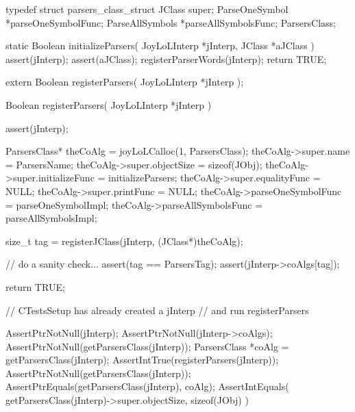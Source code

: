 \startTestSuite[registerParsers]

\startCHeader
typedef struct parsers_class_struct {
  JClass       super;
  ParseOneSymbol  *parseOneSymbolFunc;
  ParseAllSymbols *parseAllSymbolsFunc;
} ParsersClass;
\stopCHeader

\startCCode
static Boolean initializeParsers(
  JoyLoLInterp *jInterp,
  JClass   *aJClass
) {
  assert(jInterp);
  assert(aJClass);
  registerParserWords(jInterp);
  return TRUE;
}
\stopCCode

\startCHeader
extern Boolean registerParsers(
  JoyLoLInterp *jInterp
);
\stopCHeader
{}

\startCCode
Boolean registerParsers(
  JoyLoLInterp *jInterp
) {
  assert(jInterp);
  
  ParsersClass* theCoAlg          = joyLoLCalloc(1, ParsersClass);
  theCoAlg->super.name            = ParsersName;
  theCoAlg->super.objectSize      = sizeof(JObj);
  theCoAlg->super.initializeFunc  = initializeParsers;
  theCoAlg->super.equalityFunc    = NULL;
  theCoAlg->super.printFunc       = NULL;
  theCoAlg->parseOneSymbolFunc    = parseOneSymbolImpl;
  theCoAlg->parseAllSymbolsFunc   = parseAllSymbolsImpl;
  
  size_t tag =
    registerJClass(jInterp, (JClass*)theCoAlg);
  
  // do a sanity check...
  assert(tag == ParsersTag);
  assert(jInterp->coAlgs[tag]);
    
  return TRUE;
}
\stopCCode


\startCTest
  // CTestsSetup has already created a jInterp
  // and run registerParsers
  
  AssertPtrNotNull(jInterp);
  AssertPtrNotNull(jInterp->coAlgs);
  AssertPtrNotNull(getParsersClass(jInterp));
  ParsersClass *coAlg = getParsersClass(jInterp);
  AssertIntTrue(registerParsers(jInterp));
  AssertPtrNotNull(getParsersClass(jInterp));
  AssertPtrEquals(getParsersClass(jInterp), coAlg);
  AssertIntEquals(
    getParsersClass(jInterp)->super.objectSize,
    sizeof(JObj)
  )
\stopCTest
\stopTestCase
\stopTestSuite

